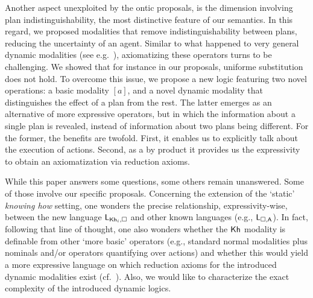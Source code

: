 Another aspect unexploited by the ontic proposals, is the dimension involving plan indistinguishability, the most distinctive feature of our semantics. In this regard, we proposed modalities that remove indistinguishability between plans, reducing the uncertainty of an agent. Similar to what happened to very general dynamic modalities (see e.g.~\cite{ArecesFH15}), axiomatizing these operators turns to be challenging. We showed that for instance in our proposals, uniforme substitution does not hold. To overcome this issue, we propose a new logic featuring two novel operations: a basic modality $[a]$, and a novel dynamic modality that distinguishes the effect of a plan from the rest. The latter emerges as an alternative of more expressive operators, but in which the information about a single plan is revealed, instead of information about two plans being different. For the former, the benefits are twofold. First, it enables us to explicitly talk about the execution of actions. Second, as a by product it provides us the expressivity to obtain an axiomatization via reduction axioms.

\begin{comment}
To the best of our knowledge, this is the first attempt to establish a theory of dynamic epistemic logics for knowing how. We argue that the semantics provided in~\cite{AFSVQ21,AFSVQ23report} is the crucial aspect for succeeding in this goal. Moreover, our work opens the path to study other dynamic operators in this context. For instance, we could define dynamic modalities based on action models, like those in~\cite{BaltagMS98,DELbook,GalimullinA22}. 
Also, it would be interesting to explore alternative techniques for obtaining proof systems without a general rule of substitution, for instance, by building a dynamic logic over a hybrid logic semantics (see e.g.~\cite{BenthemMZ2022}). Finally, we would like to characterize the exact complexity of the dynamic logics we introduced.
\end{comment}


While this paper answers some questions, some others remain unanswered. 
Some of those involve our specific proposals. 
Concerning the extension of the `static' \emph{knowing how} setting, one wonders the precise relationship, expressivity-wise, between the new language $\mathsf{L}_{{\sf Kh}_i,\square}$ and other known languages (e.g., $\mathsf{L}_{\square,{\sf A}}$). In fact, following that line of thought, one also wonders whether the ${\sf Kh}$ modality is definable from other `more basic' operators (e.g., standard normal modalities plus nominals and/or operators quantifying over actions) and whether this would yield a more expressive language on which reduction axioms for the introduced dynamic modalities exist (cf.~\cite{BenthemMZ2022}). Also, we would like to characterize the exact complexity of the introduced dynamic logics.

